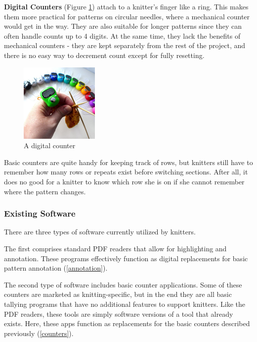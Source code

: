 \documentclass[11pt,twocolumn]{article}
\begin{document}
\textbf{Digital Counters} (Figure \ref{digital}) attach to a knitter's finger like a ring.
This makes them more practical for patterns on circular needles, where a mechanical counter would get in the way.
They are also suitable for longer patterns since they can often handle counts up to 4 digits.
At the same time, they lack the benefits of mechanical counters - they are kept separately from the rest of the project, and there is no easy way to decrement count except for fully resetting.
\begin{figure}
  \begin{center}
    \includegraphics[width=1.5in]{digitalCounter}
    \caption{A digital counter} \label{digital}
  \end{center}
\end{figure}

Basic counters are quite handy for keeping track of rows, but knitters still have to remember how many rows or repeats exist before switching sections.
After all, it does no good for a knitter to know which row she is on if she cannot remember where the pattern changes.

\subsubsection{Existing Software}

There are three types of software currently utilized by knitters.

The first comprises standard PDF readers that allow for highlighting and annotation.
These programs effectively function as digital replacements for basic pattern annotation (\ref{annotation}).

The second type of software includes basic counter applications.
Some of these counters are marketed as knitting-specific, but in the end they are all basic tallying programs that have no additional features to support knitters.
Like the PDF readers, these tools are simply software versions of a tool that already exists.
Here, these apps function as replacements for the basic counters described previously (\ref{counters}).
\end{document}
